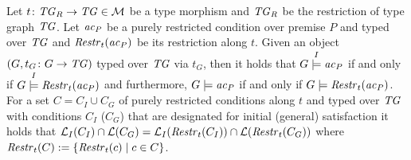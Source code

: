 \begin{proposition}
\label{prop:sec-dc-general-res:comp_res_sat_III}
Let $t\colon \mathit{TG}_R \to \mathit{TG} \in {\cal M}$ be a type morphism and $\mathit{TG}_R$ be the restriction of type graph $\mathit{TG}$.
Let $\mathit{ac}_P$ be a purely restricted condition over premise $P$ and typed over $\mathit{TG}$ and $\mathit{Restr}_t(\mathit{ac}_P)$ be its restriction along $t$.
Given an object $(G,t_G\colon G \to \mathit{TG})$ typed over $\mathit{TG}$ via $t_G$, then it holds that $G \stackrel{I}{\models} \mathit{ac}_P$ if and only if $G \stackrel{I}{\models} \mathit{Restr}_t(\mathit{ac}_P)$ and furthermore, $G \models \mathit{ac}_P$ if and only if $G \models \mathit{Restr}_t(\mathit{ac}_P)$.
For a set $C=C_I \cup C_G$ of purely restricted conditions along $t$ and typed over $\mathit{TG}$ with conditions $C_I$ ($C_G$) that are designated for initial (general) satisfaction it holds that $\mathcal{L}_I(C_I) \cap \mathcal{L}(C_G) = \mathcal{L}_I(\mathit{Restr}_t(C_I)) \cap \mathcal{L}(\mathit{Restr}_t(C_G))$ where $\mathit{Restr}_t(C):=\{\mathit{Restr}_t(c) \mid c \in C\}$.
\envEndMarker
\end{proposition}

